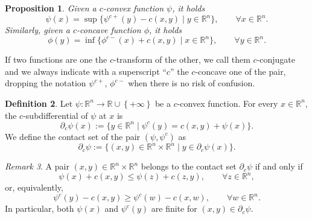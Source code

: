 \documentclass[reqno]{amsart}
\theoremstyle{plain}
\newtheorem{thm}{Theorem}[section]
\newtheorem{prop}[thm]{Proposition}
\theoremstyle{definition}
\newtheorem{Def}[thm]{Definition}
\theoremstyle{remark}
\newtheorem{rem}[thm]{Remark}
\newcommand{\R}{\mathbb{R}}
\newcommand{\red}{\color{red}}
\begin{document}
 	\begin{prop}\label{prop_c_concavity}
		Given a $c$-convex function $\psi$, it holds
		\begin{equation}\label{recover_c_convex}
			\psi(x)=\sup\{\psi^{c+}(y)-c(x,y)\mid  y\in\mathbb{R}^n\},\qquad\forall x\in\mathbb{R}^n.
		\end{equation}
		Similarly, given a $c$-concave function $\phi$, it holds
		\begin{equation}\label{recover_c_concave}
			\phi(y)=\inf\{\phi^{c-}(x)+c(x,y)\mid  x\in\mathbb{R}^n\},\qquad\forall y\in\mathbb{R}^n.
		\end{equation}
	\end{prop}
	If two functions are one the $c$-transform of the other, we call them $c$-conjugate and we always indicate with a superscript ``$c$'' the $c$-concave one of the pair, dropping the notation $\psi^{c+}$, $\phi^{c-}$ when there is no risk of confusion.
	\begin{Def}
		Let $\psi:\mathbb{R}^n\to\mathbb{R}\cup\left\{+\infty\right\}$ be a $c$-convex function. For every $x\in\mathbb{R}^n$, the $c$-subdifferential of $\psi$ at $x$ is
		\begin{equation}
			\partial_c\psi(x):=\{y\in\mathbb{R}^n\;|\;\psi^c(y)=c(x,y)+\psi(x)\}.
		\end{equation}
		We define the contact set of the pair $\left(\psi,\psi^c\right)$ as
		\begin{equation}
			\partial_c\psi:=\{(x,y)\in\mathbb{R}^n\times\mathbb{R}^n \mid y\in\partial_c\psi(x)\}.
		\end{equation}
	\end{Def}
	\begin{rem}\label{charach_contact_set}
		A pair $(x,y)\in\mathbb{R}^n\times\mathbb{R}^n$ belongs to the contact set $\partial_c\psi$ if and only if
		\begin{equation}
			\psi(x)+c(x,y)\leq\psi(z)+c(z,y),\qquad\forall z\in\mathbb{R}^n,
		\end{equation}
		or, equivalently,
		\begin{equation}
			\psi^c(y)-c(x,y)\geq\psi^c(w)-c(x,w),\qquad\forall w\in\mathbb{R}^n.
		\end{equation}
		In particular, both $\psi(x)$ and $\psi^c(y)$ are finite for $(x,y)\in \partial_c\psi$.
	\end{rem}
\end{document}
